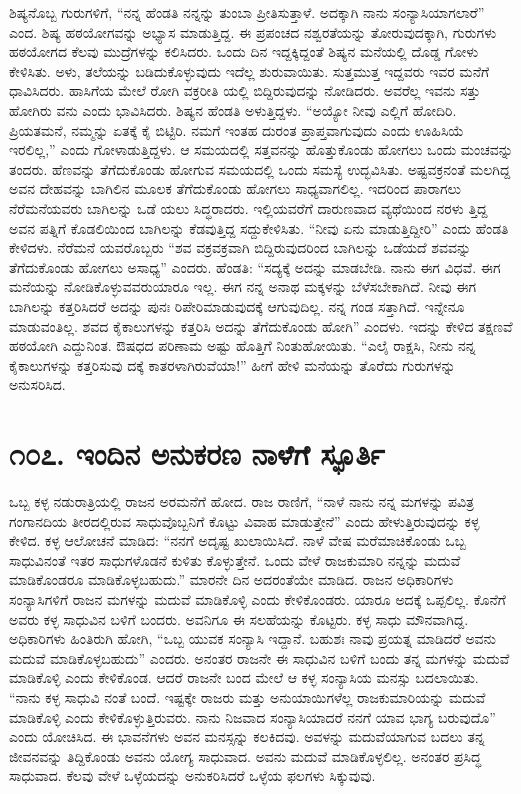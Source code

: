 ಶಿಷ್ಯನೊಬ್ಬ ಗುರುಗಳಿಗೆ, “ನನ್ನ ಹೆಂಡತಿ ನನ್ನನ್ನು ತುಂಬಾ ಪ್ರೀತಿಸುತ್ತಾಳೆ. ಅದಕ್ಕಾಗಿ ನಾನು ಸಂನ್ಯಾಸಿಯಾಗಲಾರೆ” ಎಂದ. ಶಿಷ್ಯ ಹಠಯೋಗವನ್ನು ಅಭ್ಯಾಸ ಮಾಡುತ್ತಿದ್ದ. ಈ ಪ್ರಪಂಚದ ನಶ್ವರತೆಯನ್ನು ತೋರುವುದಕ್ಕಾಗಿ, ಗುರುಗಳು ಹಠಯೋಗದ ಕೆಲವು ಮುದ್ರೆಗಳನ್ನು ಕಲಿಸಿದರು. ಒಂದು ದಿನ ಇದ್ದಕ್ಕಿದ್ದಂತೆ ಶಿಷ್ಯನ ಮನೆಯಲ್ಲಿ ದೊಡ್ಡ ಗೋಳು ಕೇಳಿಸಿತು. ಅಳು, ತಲೆಯನ್ನು ಬಡಿದುಕೊಳ್ಳುವುದು ಇದೆಲ್ಲ ಶುರುವಾಯಿತು. ಸುತ್ತಮುತ್ತ ಇದ್ದವರು ಇವರ ಮನೆಗೆ ಧಾವಿಸಿದರು. ಹಾಸಿಗೆಯ ಮೇಲೆ ರೋಗಿ ವಕ್ರರೀತಿ ಯಲ್ಲಿ ಬಿದ್ದಿರುವುದನ್ನು ನೋಡಿದರು. ಅವರೆಲ್ಲ ಇವನು ಸತ್ತು ಹೋಗಿರು ವನು ಎಂದು ಭಾವಿಸಿದರು. ಶಿಷ್ಯನ ಹೆಂಡತಿ ಅಳುತ್ತಿದ್ದಳು. “ಅಯ್ಯೋ ನೀವು ಎಲ್ಲಿಗೆ ಹೋದಿರಿ. ಪ್ರಿಯತಮನೆ, ನಮ್ಮನ್ನು ಏತಕ್ಕೆ ಕೈ ಬಿಟ್ಟಿರಿ. ನಮಗೆ ಇಂತಹ ದುರಂತ ಪ್ರಾಪ್ತವಾಗುವುದು ಎಂದು ಊಹಿಸಿಯೆ ಇರಲಿಲ್ಲ,” ಎಂದು ಗೋಳಾಡುತ್ತಿದ್ದಳು. ಆ ಸಮಯದಲ್ಲಿ ಸತ್ತವನನ್ನು ಹೊತ್ತುಕೊಂಡು ಹೋಗಲು ಒಂದು ಮಂಚವನ್ನು ತಂದರು. ಹೆಣವನ್ನು ತೆಗೆದುಕೊಂಡು ಹೋಗುವ ಸಮಯದಲ್ಲಿ ಒಂದು ಸಮಸ್ಯೆ ಉದ್ಭವಿಸಿತು. ಅಷ್ಟವಕ್ರನಂತೆ ಮಲಗಿದ್ದ ಅವನ ದೇಹವನ್ನು ಬಾಗಿಲಿನ ಮೂಲಕ ತೆಗೆದುಕೊಂಡು ಹೋಗಲು ಸಾಧ್ಯವಾಗಲಿಲ್ಲ. ಇದರಿಂದ ಪಾರಾಗಲು ನೆರೆಮನೆಯವರು ಬಾಗಿಲನ್ನು ಒಡೆ ಯಲು ಸಿದ್ಧರಾದರು. ಇಲ್ಲಿಯವರೆಗೆ ದಾರುಣವಾದ ವ್ಯಥೆಯಿಂದ ನರಳು ತ್ತಿದ್ದ ಅವನ ಪತ್ನಿಗೆ ಕೊಡಲಿಯಿಂದ ಬಾಗಿಲನ್ನು ಕೆಡವುತ್ತಿದ್ದ ಸದ್ದುಕೇಳಿಸಿತು. “ನೀವು ಏನು ಮಾಡುತ್ತಿದ್ದೀರಿ” ಎಂದು ಹೆಂಡತಿ ಕೇಳಿದಳು. ನೆರೆಮನೆ ಯವರೊಬ್ಬರು “ಶವ ವಕ್ರವಕ್ರವಾಗಿ ಬಿದ್ದಿರುವುದರಿಂದ ಬಾಗಿಲನ್ನು ಒಡೆಯದೆ ಶವವನ್ನು ತೆಗೆದುಕೊಂಡು ಹೋಗಲು ಅಸಾಧ್ಯ” ಎಂದರು. ಹೆಂಡತಿ: “ಸದ್ಯಕ್ಕೆ ಅದನ್ನು ಮಾಡಬೇಡಿ. ನಾನು ಈಗ ವಿಧವೆ. ಈಗ ಮನೆಯನ್ನು ನೋಡಿಕೊಳ್ಳುವವರುಯಾರೂ ಇಲ್ಲ. ಈಗ ನನ್ನ ಅನಾಥ ಮಕ್ಕಳನ್ನು ಬೆಳೆಸಬೇಕಾಗಿದೆ. ನೀವು ಈಗ ಬಾಗಿಲನ್ನು ಕತ್ತರಿಸಿದರೆ ಅದನ್ನು ಪುನಃ ರಿಪೇರಿಮಾಡುವುದಕ್ಕೆ ಆಗುವುದಿಲ್ಲ. ನನ್ನ ಗಂಡ ಸತ್ತಾಗಿದೆ. ಇನ್ನೇನೂ ಮಾಡುವಂತಿಲ್ಲ. ಶವದ ಕೈಕಾಲುಗಳನ್ನು ಕತ್ತರಿಸಿ ಅದನ್ನು ತೆಗೆದುಕೊಂಡು ಹೋಗಿ” ಎಂದಳು. ಇದನ್ನು ಕೇಳಿದ ತಕ್ಷಣವೆ ಹಠಯೋಗಿ ಎದ್ದುನಿಂತ. ಔಷಧದ ಪರಿಣಾಮ ಅಷ್ಟು ಹೊತ್ತಿಗೆ ನಿಂತುಹೋಯಿತು. “ಎಲೈ ರಾಕ್ಷಸಿ, ನೀನು ನನ್ನ ಕೈಕಾಲುಗಳನ್ನು ಕತ್ತರಿಸುವು ದಕ್ಕೆ ಕಾತರಳಾಗಿರುವೆಯಾ!” ಹೀಗೆ ಹೇಳಿ ಮನೆಯನ್ನು ತೊರೆದು ಗುರುಗಳನ್ನು ಅನುಸರಿಸಿದ.


\section{\num{೧೦೭. } ಇಂದಿನ ಅನುಕರಣ ನಾಳೆಗೆ ಸ್ಫೂರ್ತಿ}

ಒಬ್ಬ ಕಳ್ಳ ನಡುರಾತ್ರಿಯಲ್ಲಿ ರಾಜನ ಅರಮನೆಗೆ ಹೋದ. ರಾಜ ರಾಣಿಗೆ, “ನಾಳೆ ನಾನು ನನ್ನ ಮಗಳನ್ನು ಪವಿತ್ರ ಗಂಗಾನದಿಯ ತೀರದಲ್ಲಿರುವ ಸಾಧುವೊಬ್ಬನಿಗೆ ಕೊಟ್ಟು ವಿವಾಹ ಮಾಡುತ್ತೇನೆ” ಎಂದು ಹೇಳುತ್ತಿರುವುದನ್ನು ಕಳ್ಳ ಕೇಳಿದ. ಕಳ್ಳ ಆಲೋಚನೆ ಮಾಡಿದ: “ನನಗೆ ಅದೃಷ್ಟ ಖುಲಾಯಿಸಿದೆ. ನಾಳೆ ವೇಷ ಮರೆಮಾಚಿಕೊಂಡು ಒಬ್ಬ ಸಾಧುವಿನಂತೆ ಇತರ ಸಾಧುಗಳೊಡನೆ ಕುಳಿತು ಕೊಳ್ಳುತ್ತೇನೆ. ಒಂದು ವೇಳೆ ರಾಜಕುಮಾರಿ ನನ್ನನ್ನು ಮದುವೆ ಮಾಡಿಕೊಂಡರೂ ಮಾಡಿಕೊಳ್ಳಬಹುದು.” ಮಾರನೇ ದಿನ ಅದರಂತೆಯೇ ಮಾಡಿದ. ರಾಜನ ಅಧಿಕಾರಿಗಳು ಸಂನ್ಯಾಸಿಗಳಿಗೆ ರಾಜನ ಮಗಳನ್ನು ಮದುವೆ ಮಾಡಿಕೊಳ್ಳಿ ಎಂದು ಕೇಳಿಕೊಂಡರು. ಯಾರೂ ಅದಕ್ಕೆ ಒಪ್ಪಲಿಲ್ಲ. ಕೊನೆಗೆ ಅವರು ಕಳ್ಳ ಸಾಧುವಿನ ಬಳಿಗೆ ಬಂದರು. ಅವನಿಗೂ ಈ ಸಲಹೆಯನ್ನು ಕೊಟ್ಟರು. ಕಳ್ಳ ಸಾಧು ಮೌನವಾಗಿದ್ದ. ಅಧಿಕಾರಿಗಳು ಹಿಂತಿರುಗಿ ಹೋಗಿ, “ಒಬ್ಬ ಯುವಕ ಸಂನ್ಯಾಸಿ ಇದ್ದಾನೆ. ಬಹುಶಃ ನಾವು ಪ್ರಯತ್ನ ಮಾಡಿದರೆ ಅವನು ಮದುವೆ ಮಾಡಿಕೊಳ್ಳಬಹುದು” ಎಂದರು. ಅನಂತರ ರಾಜನೇ ಈ ಸಾಧುವಿನ ಬಳಿಗೆ ಬಂದು ತನ್ನ ಮಗಳನ್ನು ಮದುವೆ ಮಾಡಿಕೊಳ್ಳಿ ಎಂದು ಕೇಳಿಕೊಂಡ. ಆದರೆ ರಾಜನೇ ಬಂದ ಮೇಲೆ ಆ ಕಳ್ಳ ಸಂನ್ಯಾಸಿಯ ಮನಸ್ಸು ಬದಲಾಯಿತು. “ನಾನು ಕಳ್ಳ ಸಾಧುವಿ ನಂತೆ ಬಂದೆ. ಇಷ್ಟಕ್ಕೇ ರಾಜರು ಮತ್ತು ಅನುಯಾಯಿಗಳೆಲ್ಲ ರಾಜಕುಮಾರಿಯನ್ನು ಮದುವೆ ಮಾಡಿಕೊಳ್ಳಿ ಎಂದು ಕೇಳಿಕೊಳ್ಳುತ್ತಿರುವರು. ನಾನು ನಿಜವಾದ ಸಂನ್ಯಾಸಿಯಾದರೆ ನನಗೆ ಯಾವ ಭಾಗ್ಯ ಬರುವುದೊ” ಎಂದು ಯೋಚಿಸಿದ. ಈ ಭಾವನೆಗಳು ಅವನ ಮನಸ್ಸನ್ನು ಕಲಕಿದವು. ಅವಳನ್ನು ಮದುವೆಯಾಗುವ ಬದಲು ತನ್ನ ಜೀವನವನ್ನು ತಿದ್ದಿಕೊಂಡು ಅವನು ಯೋಗ್ಯ ಸಾಧುವಾದ. ಅವನು ಮದುವೆ ಮಾಡಿಕೊಳ್ಳಲಿಲ್ಲ. ಅನಂತರ ಪ್ರಸಿದ್ಧ ಸಾಧುವಾದ. ಕೆಲವು ವೇಳೆ ಒಳ್ಳೆಯದನ್ನು ಅನುಕರಿಸಿದರೆ ಒಳ್ಳೆಯ ಫಲಗಳು ಸಿಕ್ಕುವುವು.


